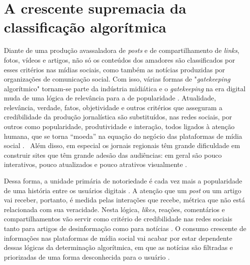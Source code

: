 \documentclass[portuguese]{textolivre}
\begin{document}
\section{A crescente supremacia da classificação algorítmica}

Diante de uma produção avassaladora de \emph{posts} e de compartilhamento de \emph{links}, fotos, vídeos e artigos, não só os conteúdos dos amadores são classificados por esses critérios nas mídias sociais, como também as notícias produzidas por organizações de comunicação social. Com isso, várias formas de "\emph{gatekeeping} algorítmico" tornam-se parte da indústria midiática e o \emph{gatekeeping} na era digital muda de uma lógica de relevância para a de popularidade \cite{heinderyckx_reformed_2016}. Atualidade, relevância, verdade, fatos, objetividade e outros critérios que asseguram a credibilidade da produção jornalística são substituídos, nas redes sociais, por outros como popularidade, produtividade e interação, todos ligados à atenção humana, que se torna “moeda” na equação do negócio das plataformas de mídia social \cite{davenport_attention_2001}.  Além disso, em especial os jornais regionais têm grande dificuldade em construir sites que têm grande adesão das audiências: em geral são pouco interativos, pouco atualizados e pouco atrativos visualmente \cite{hidman2015}.

Dessa forma, a unidade primária de notoriedade é cada vez mais a popularidade de uma história entre os usuários digitais \cite{heinderyckx_reformed_2016}. A atenção que um \emph{post} ou um artigo vai receber, portanto, é medida pelas interações que recebe, métrica que não está relacionada com sua veracidade. Nesta lógica, \emph{likes}, reações, comentários e compartilhamentos vão servir como critério de credibilidade nas redes sociais tanto para artigos de desinformação como para notícias \cite{delmazo_fake_2018}. O consumo crescente de informações nas plataformas de mídia social vai acabar por estar dependente dessas lógicas da determinação algorítmica, em que as notícias são filtradas e priorizadas de uma forma desconhecida para o usuário \cite{garcia-orosa_algorithms_2023}.
\end{document}
